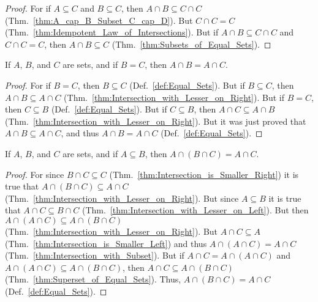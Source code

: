         \begin{proof}
            For if $A\subseteq{C}$ and $B\subseteq{C}$, then
            $A\cap{B}\subseteq{C}\cap{C}$
            (Thm.~\ref{thm:A_cap_B_Subset_C_cap_D}). But $C\cap{C}=C$
            (Thm.~\ref{thm:Idempotent_Law_of_Intersections}). But if
            $A\cap{B}\subseteq{C}\cap{C}$ and $C\cap{C}=C$, then
            $A\cap{B}\subseteq{C}$ (Thm.~\ref{thm:Subsets_of_Equal_Sets}).
        \end{proof}
        \begin{theorem}
            \label{thm:Intersection_with_Equal_Sets}%
            If $A$, $B$, and $C$ are sets, and if $B=C$, then
            $A\cap{B}=A\cap{C}$.
        \end{theorem}
        \begin{proof}
            For if $B=C$, then $B\subseteq{C}$ (Def.~\ref{def:Equal_Sets}).
            But if $B\subseteq{C}$, then $A\cap{B}\subseteq{A}\cap{C}$
            (Thm.~\ref{thm:Intersection_with_Lesser_on_Right}). But if $B=C$,
            then $C\subseteq{B}$ (Def.~\ref{def:Equal_Sets}). But if
            $C\subseteq{B}$, then $A\cap{C}\subseteq{A}\cap{B}$
            (Thm.~\ref{thm:Intersection_with_Lesser_on_Right}). But it was just
            proved that $A\cap{B}\subseteq{A}\cap{C}$, and thus
            $A\cap{B}=A\cap{C}$ (Def.~\ref{def:Equal_Sets}).
        \end{proof}
        \begin{theorem}
            \label{thm:Lemma_1_for_Assoc_Law_of_Intersections}%
            If $A$, $B$, and $C$ are sets, and if $A\subseteq{B}$, then
            $A\cap(B\cap{C})=A\cap{C}$.
        \end{theorem}
        \begin{proof}
            For since $B\cap{C}\subseteq{C}$
            (Thm.~\ref{thm:Intersection_is_Smaller_Right}) it is true that
            $A\cap(B\cap{C})\subseteq{A}\cap{C}$
            (Thm.~\ref{thm:Intersection_with_Lesser_on_Right}). But since
            $A\subseteq{B}$ it is true that $A\cap{C}\subseteq{B}\cap{C}$
            (Thm.~\ref{thm:Intersection_with_Lesser_on_Left}). But then
            $A\cap(A\cap{C})\subseteq{A}\cap(B\cap{C})$
            (Thm.~\ref{thm:Intersection_with_Lesser_on_Right}). But
            $A\cap{C}\subseteq{A}$ (Thm.~\ref{thm:Intersection_is_Smaller_Left})
            and thus $A\cap(A\cap{C})=A\cap{C}$
            (Thm.~\ref{thm:Intersection_with_Subset}). But if
            $A\cap{C}=A\cap(A\cap{C})$ and
            $A\cap(A\cap{C})\subseteq{A}\cap(B\cap{C})$, then
            $A\cap{C}\subseteq{A}\cap(B\cap{C})$
            (Thm.~\ref{thm:Superset_of_Equal_Sets}). Thus,
            $A\cap(B\cap{C})=A\cap{C}$ (Def.~\ref{def:Equal_Sets}).
        \end{proof}
